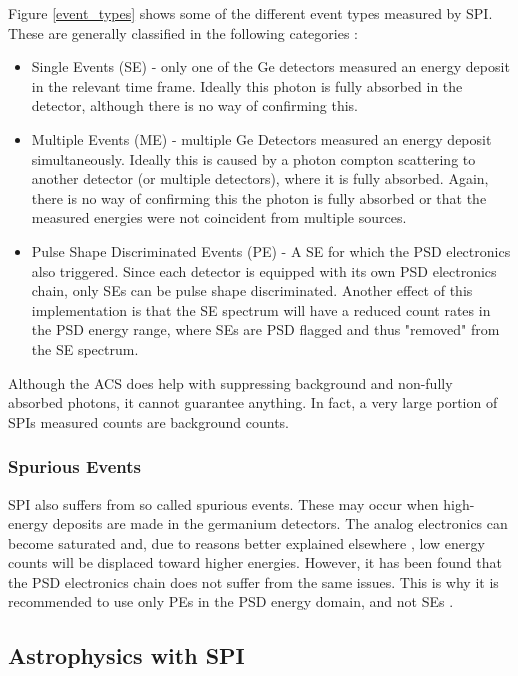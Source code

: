 \documentclass{report}
\begin{document}
Figure \ref{event_types} shows some of the different event types measured by SPI. These are generally classified in the following categories \cite{Roques}:

\begin{itemize}
  \item Single Events (SE) - only one of the Ge detectors measured an energy deposit in the relevant time frame. Ideally this photon is fully absorbed in the detector, although there is no way of confirming this.
  \item Multiple Events (ME) - multiple Ge Detectors measured an energy deposit simultaneously. Ideally this is caused by a photon compton scattering to another detector (or multiple detectors), where it is fully absorbed. Again, there is no way of confirming this the photon is fully absorbed or that the measured energies were not coincident from multiple sources.
  \item Pulse Shape Discriminated Events (PE) - A SE for which the PSD electronics also triggered. Since each detector is equipped with its own PSD electronics chain, only SEs can be pulse shape discriminated. Another effect of this implementation is that the SE spectrum will have a reduced count rates in the PSD energy range, where SEs are PSD flagged and thus "removed" from the SE spectrum. 
\end{itemize}

Although the ACS does help with suppressing background and non-fully absorbed photons, it cannot guarantee  anything. In fact, a very large portion of SPIs measured counts are background counts. 

\subsubsection*{Spurious Events} \label{sec spurious events}
SPI also suffers from so called spurious events. These may occur when high-energy deposits are made in the germanium detectors. The analog electronics can become saturated and, due to reasons better explained elsewhere \cite{Roques}, low energy counts will be displaced toward higher energies. However, it has been found that the PSD electronics chain does not suffer from the same issues. This is why it is recommended to use only PEs in the PSD energy domain, and not SEs \cite{Roques}. 


\subsection{Astrophysics with SPI} \label{sec astrophysics with SPI}
\end{document}
